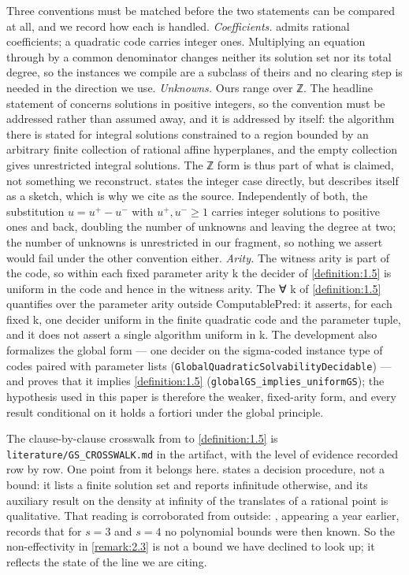 Three conventions must be matched before the two statements can be compared at all, and we record how each is handled. \emph{Coefficients.} \cite{GS04} admits rational coefficients; a quadratic code carries integer ones. Multiplying an equation through by a common denominator changes neither its solution set nor its total degree, so the instances we compile are a subclass of theirs and no clearing step is needed in the direction we use. \emph{Unknowns.} Ours range over ℤ. The headline statement of \cite{GS04} concerns solutions in positive integers, so the convention must be addressed rather than assumed away, and it is addressed by \cite{GS04} itself: the algorithm there is stated for integral solutions constrained to a region bounded by an arbitrary finite collection of rational affine hyperplanes, and the empty collection gives unrestricted integral solutions. The ℤ form is thus part of what is claimed, not something we reconstruct. \cite{GS81} states the integer case directly, but describes itself as a sketch, which is why we cite \cite{GS04} as the source. Independently of both, the substitution $u = u^{+} − u^{-}$ with $u^{+}, u^{-} ≥ 1$ carries integer solutions to positive ones and back, doubling the number of unknowns and leaving the degree at two; the number of unknowns is unrestricted in our fragment, so nothing we assert would fail under the other convention either. \emph{Arity.} The witness arity is part of the code, so within each fixed parameter arity k the decider of \cref{definition:1.5} is uniform in the code and hence in the witness arity. The ∀ k of \cref{definition:1.5} quantifies over the parameter arity outside \textrm{ComputablePred}: it asserts, for each fixed k, one decider uniform in the finite quadratic code and the parameter tuple, and it does not assert a single algorithm uniform in k. The development also formalizes the global form — one decider on the sigma-coded instance type of codes paired with parameter lists (\texttt{GlobalQuadraticSolvabilityDecidable}) — and proves that it implies \cref{definition:1.5} (\texttt{globalGS\_\allowbreak{}implies\_\allowbreak{}uniformGS}); the hypothesis used in this paper is therefore the weaker, fixed-arity form, and every result conditional on it holds a fortiori under the global principle.

The clause-by-clause crosswalk from \cite{GS04} to \cref{definition:1.5} is \texttt{literature/GS\_\allowbreak{}CROSSWALK.\allowbreak{}md} in the artifact, with the level of evidence recorded row by row. One point from it belongs here. \cite{GS04} states a decision procedure, not a bound: it lists a finite solution set and reports infinitude otherwise, and its auxiliary result on the density at infinity of the translates of a rational point is qualitative. That reading is corroborated from outside: \cite{Die03}, appearing a year earlier, records that for $s = 3$ and $s = 4$ no polynomial bounds were then known. So the non-effectivity in \cref{remark:2.3} is not a bound we have declined to look up; it reflects the state of the line we are citing.

